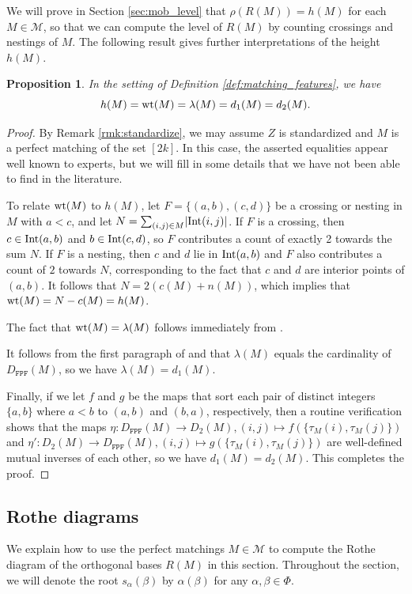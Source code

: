 \documentclass[10pt,a4paper]{amsart}
\newtheorem{prop}[theorem]{Proposition}
\numberwithin{equation}{section}
\newcommand{\al}{\alpha}
\newcommand{\be}{\beta}
\newcommand{\ra}{\rightarrow}
\newcommand{\calm}{\mathcal{M}}
\DeclareMathOperator{\wt}{\rm{wt}}
\DeclareMathOperator{\interior}{\rm{Int}}
\newcommand{\abs}[1]{\lvert #1 \rvert}
\begin{document}
We will prove in Section \ref{sec:mob_level} that $\rho(R(M))=h(M)$ for each
$M\in \calm$, so that we can compute the level of $R(M)$ by counting crossings
and nestings of $M$. The following result gives further interpretations of the
height $h(M)$.

\begin{prop}
\label{prop:wt}
In the setting of Definition \ref{def:matching_features}, we have
\[
h(M)=\wt(M)=\lambda(M)=d_1(M)=d_2(M).
\]
\end{prop}

\begin{proof}
By Remark \ref{rmk:standardize}, we may assume $Z$ is standardized and $M$ is a
perfect matching of the set $[2k]$. In this case, the asserted equalities appear
well known to experts, but we will fill in some details that we have not been
able to find in the literature. 

To relate $\wt(M)$ to $h(M)$, let $F=\{(a,b), (c,d)\}$ be a crossing or nesting
in $M$ with $a<c$, and let $N=\sum_{(i,j)\in M}\abs{\interior(i,j)}$. If $F$ is
a crossing, then $c \in \interior(a,b)$ and $b\in \interior(c,d)$, so $F$
contributes a count of exactly 2 towards the sum $N$. If $F$ is a nesting, then
$c$ and $d$ lie in $\interior(a,b)$ and $F$ also contributes a count of $2$ towards
$N$, corresponding to the fact that $c$ and $d$ are interior points of $(a,b)$.
It follows that $N=2(c(M)+n(M))$, which implies that $\wt(M)=N-c(M)=h(M)$. 

The fact that $\wt(M)=\lambda(M)$ follows immediately from \cite[Proposition
9]{watson14}. 

It follows from the first paragraph of \cite[Section 3]{hamaker18} and
\cite[Proposition 3.6]{hamaker18} that $\lambda(M)$ equals the cardinality of
$D_\texttt{FPF}(M)$, so we have $\lambda(M)=d_1(M)$.

Finally, if we let $f$ and $g$ be the maps that sort each pair of distinct integers $\{a,b\}$ where $a<b$
to $(a,b)$ and $(b,a)$, respectively, then a routine
verification shows that the maps $\eta: D_\texttt{FPF}(M)\ra D_2(M), (i,j)\mapsto
f(\{\tau_M(i),\tau_M(j)\})$ and $\eta': D_2(M)\ra D_\texttt{FPF}(M), (i,j)\mapsto
g(\{\tau_M(i),\tau_M(j)\})$ are well-defined mutual inverses of each other, so
we have $d_1(M)=d_2(M)$. This completes the proof.
\end{proof}

\subsection{Rothe diagrams}
\label{sec:mob_res}
We explain how to use the perfect matchings $M\in \calm$ to compute the
Rothe diagram of the orthogonal bases $R(M)$ in this section.
Throughout the section, we will denote the root $s_\al(\be)$ by $\al(\be)$ for
any $\al,\be\in \Phi$.
\end{document}
